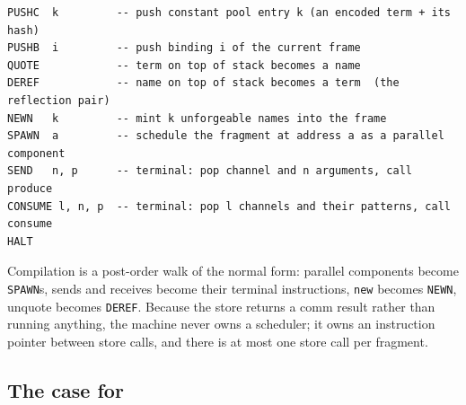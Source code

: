 \documentclass[11pt,a4paper]{article}
\newcommand{\code}[1]{\texttt{#1}}
\theoremstyle{definition}
\theoremstyle{plain}
\begin{document}
\begin{lstlisting}
PUSHC  k         -- push constant pool entry k (an encoded term + its hash)
PUSHB  i         -- push binding i of the current frame
QUOTE            -- term on top of stack becomes a name
DEREF            -- name on top of stack becomes a term  (the reflection pair)
NEWN   k         -- mint k unforgeable names into the frame
SPAWN  a         -- schedule the fragment at address a as a parallel component
SEND   n, p      -- terminal: pop channel and n arguments, call produce
CONSUME l, n, p  -- terminal: pop l channels and their patterns, call consume
HALT
\end{lstlisting}

\noindent
Compilation is a post-order walk of the normal form: parallel components become
\code{SPAWN}s, sends and receives become their terminal instructions, \code{new}
becomes \code{NEWN}, unquote becomes \code{DEREF}. Because the store returns a
comm result rather than running anything, the machine never owns a scheduler;
it owns an instruction pointer between store calls, and there is at most one
store call per fragment.

\subsection{The case for}
\end{document}
